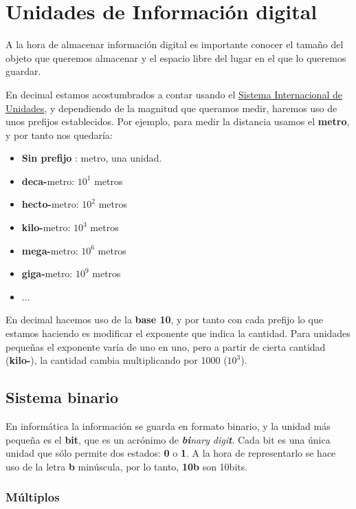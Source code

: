 \chapter{Unidades de Información digital}

A la hora de almacenar información digital es importante conocer el tamaño del objeto que queremos almacenar y el espacio libre del lugar en el que lo queremos guardar.

En decimal estamos acostumbrados a contar usando el \href{https://es.wikipedia.org/wiki/Sistema_Internacional_de_Unidades}{Sistema Internacional de Unidades}, y dependiendo de la magnitud que queramos medir, haremos uso de unos prefijos establecidos. Por ejemplo, para medir la distancia usamos el \textbf{metro}, y por tanto nos quedaría:

\begin{itemize}
    \item \textbf{Sin prefijo} : metro, una unidad.
    \item \textbf{deca-}metro: $10^1$ metros
    \item \textbf{hecto-}metro: $10^2$ metros
    \item \textbf{kilo-}metro: $10^3$ metros
    \item \textbf{mega-}metro: $10^6$ metros
    \item \textbf{giga-}metro: $10^9$ metros
    \item ...
\end{itemize}

En decimal hacemos uso de la \textbf{base 10}, y por tanto  con cada prefijo lo que estamos haciendo es modificar el exponente que indica la cantidad. Para unidades pequeñas el exponente varía de uno en uno, pero a partir de cierta cantidad (\textbf{kilo-}), la cantidad cambia multiplicando por 1000 ($10^3$).


\section{Sistema binario}

En informática la información se guarda en formato binario, y la unidad más pequeña es el \textbf{bit}, que es un acrónimo de \textit{\textbf{bi}nary digi\textbf{t}}. Cada bit es una única unidad que sólo permite dos estados: \textbf{0} o \textbf{1}. A la hora de representarlo se hace uso de la letra \textbf{b} minúscula, por lo tanto, \textbf{10b} son 10bits.


\subsection{Múltiplos}

